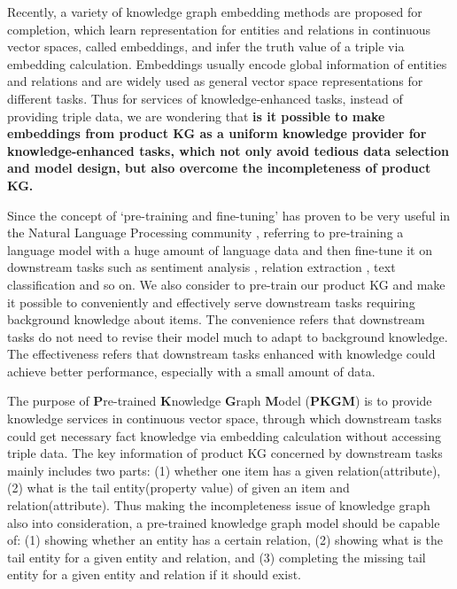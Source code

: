 Recently, a variety of knowledge graph embedding methods\cite{TransE-Bordes-2013} are proposed for completion, which learn representation for entities and relations in continuous vector spaces, called embeddings, and infer the truth value of a triple via embedding calculation. Embeddings usually encode global information of entities and relations and are widely used as general vector space representations for different tasks. Thus for services of knowledge-enhanced tasks, instead of providing triple data, we are wondering that \textbf{is it possible to make embeddings from product KG as a uniform knowledge provider for knowledge-enhanced tasks, which not only avoid tedious data selection and model design, but also overcome the incompleteness of product KG.}

Since the concept of `pre-training and fine-tuning' has proven to be very useful in the Natural Language Processing community \cite{BERT}, referring to pre-training a language model with a huge amount of language data and then fine-tune it on downstream tasks such as sentiment analysis \cite{ACL2020_Pretrain4SA}, relation extraction \cite{ACL2019_Pretrain4RE}, text classification \cite{EMNLP2019_Pretrain4TC} and so on. We also consider to pre-train our product KG and make it possible to conveniently and effectively serve downstream tasks requiring background knowledge about items. The convenience refers that downstream tasks do not need to revise their model much to adapt to background knowledge. The effectiveness refers that downstream tasks enhanced with knowledge could achieve better performance, especially with a small amount of data. 

The purpose of \textbf{P}re-trained \textbf{K}nowledge \textbf{G}raph \textbf{M}odel (\textbf{PKGM}) is to provide knowledge services in continuous vector space, through which downstream tasks could get necessary fact knowledge via embedding calculation without accessing triple data. The key information of product KG concerned by downstream tasks mainly includes two parts: (1) whether one item has a given relation(attribute), (2) what is the tail entity(property value) of given an item and relation(attribute). Thus making the incompleteness issue of knowledge graph also into consideration, a pre-trained knowledge graph model should be capable of: (1) showing whether an entity has a certain relation, (2) showing what is the tail entity for a given entity and relation, and (3) completing the missing tail entity for a given entity and relation if it should exist.

